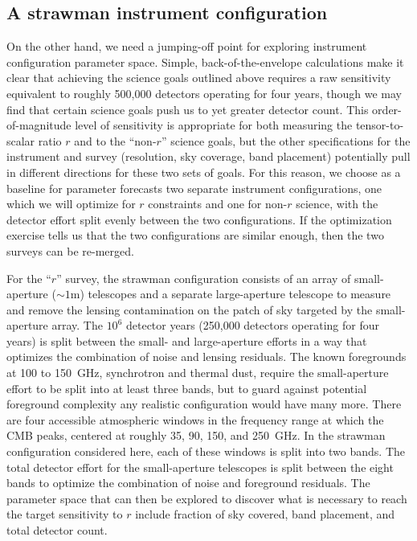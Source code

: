 \subsection{A strawman instrument configuration}

On the other hand, we need a jumping-off point for exploring instrument configuration parameter space. Simple, back-of-the-envelope calculations make it clear that achieving the science goals outlined above requires a raw sensitivity equivalent to roughly 500,000 detectors operating for four years, though we may find that certain science goals push us to yet greater detector count. This order-of-magnitude level of sensitivity is appropriate for both measuring the tensor-to-scalar ratio $r$ and to the ``non-$r$'' science goals, but the other specifications for the instrument and survey (resolution, sky coverage, band placement) potentially pull in different directions for these two sets of goals. For this reason, we choose as a baseline for parameter forecasts two separate instrument configurations, one which we will optimize for $r$ constraints and one for non-$r$ science, with the detector effort split evenly between the two configurations. If the optimization exercise tells us that the two configurations are similar enough, then the two surveys can be re-merged. 

For the ``$r$'' survey, the strawman configuration consists of an array of small-aperture ($\sim 1$m) telescopes and a separate large-aperture telescope to measure and remove the lensing contamination on the patch of sky targeted by the small-aperture array. The $10^6$ detector years (250,000 detectors operating for four years) is split between the small- and large-aperture efforts in a way that optimizes the combination of noise and lensing residuals. The known foregrounds at 100 to 150~GHz, synchrotron and thermal dust, require the small-aperture effort to be split into at least three bands, but to guard against potential foreground complexity any realistic configuration would have many more. There are four accessible atmospheric windows in the frequency range at which the CMB peaks, centered at roughly 35, 90, 150, and 250~GHz. In the strawman configuration considered here, each of these windows is split into two bands. The total detector effort for the small-aperture telescopes is split between the eight bands to optimize the combination of noise and foreground residuals. The parameter space that can then be explored to discover what is necessary to reach the target sensitivity to $r$ include fraction of sky covered, band placement, and total detector count.

